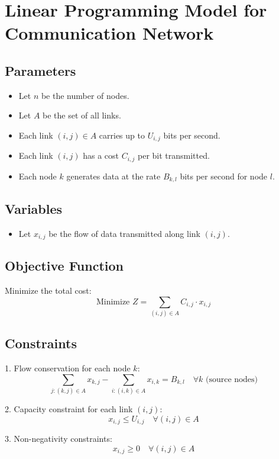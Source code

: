 \documentclass{article}
\begin{document}
\section*{Linear Programming Model for Communication Network}

\subsection*{Parameters}
\begin{itemize}
    \item Let \( n \) be the number of nodes.
    \item Let \( A \) be the set of all links.
    \item Each link \( (i,j) \in A \) carries up to \( U_{i,j} \) bits per second.
    \item Each link \( (i,j) \) has a cost \( C_{i,j} \) per bit transmitted.
    \item Each node \( k \) generates data at the rate \( B_{k,l} \) bits per second for node \( l \).
\end{itemize}

\subsection*{Variables}
\begin{itemize}
    \item Let \( x_{i,j} \) be the flow of data transmitted along link \( (i,j) \).
\end{itemize}

\subsection*{Objective Function}
Minimize the total cost:
\[
\text{Minimize } Z = \sum_{(i,j) \in A} C_{i,j} \cdot x_{i,j}
\]

\subsection*{Constraints}
1. Flow conservation for each node \( k \):
\[
\sum_{j : (k,j) \in A} x_{k,j} - \sum_{i : (i,k) \in A} x_{i,k} = B_{k,l} \quad \forall k \text{ (source nodes)}
\]

2. Capacity constraint for each link \( (i,j) \):
\[
x_{i,j} \leq U_{i,j} \quad \forall (i,j) \in A
\]

3. Non-negativity constraints:
\[
x_{i,j} \geq 0 \quad \forall (i,j) \in A
\]
\end{document}
